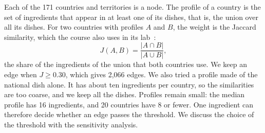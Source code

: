 Each of the 171 countries and territories is a node. The profile of a country
is the set of ingredients that appear in at least one of its dishes, that is,
the union over all its dishes. For two countries with profiles $A$ and $B$,
the weight is the Jaccard similarity, which the course also uses in its
lab~\cite{quercini2026}:
\begin{equation*}
  J(A,B) = \frac{|A \cap B|}{|A \cup B|},
\end{equation*}
the share of the ingredients of the union that both countries use. We keep an
edge when $J \geq 0.30$, which gives 2{,}066 edges. We also tried a profile
made of the national dish alone. It has about ten ingredients per country, so
the similarities are too coarse, and we keep all the dishes. Profiles remain
small: the median profile has 16 ingredients, and 20 countries have 8 or
fewer. One ingredient can therefore decide whether an edge passes the
threshold. We discuss the choice of the threshold with the sensitivity
analysis.
